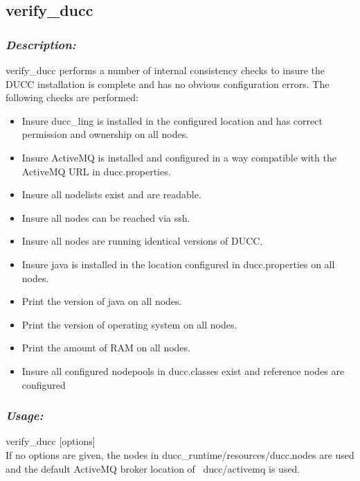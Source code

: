 \subsection{verify\_ducc}

    \subsubsection{{\em Description:}}
    verify\_ducc performs a number of internal consistency checks to insure the DUCC installation 
    is complete and has no obvious configuration errors. The following checks are performed: 
    \begin{itemize}
      \item Insure ducc\_ling is installed in the configured location and has correct permission and ownership on all nodes. 
      \item Insure ActiveMQ is installed and configured in a way compatible with the ActiveMQ URL in ducc.properties. 
      \item Insure all nodelists exist and are readable. 
      \item Insure all nodes can be reached via ssh. 
      \item Insure all nodes are running identical versions of DUCC. 
      \item Insure java is installed in the location configured in ducc.properties on all nodes. 
      \item Print the version of java on all nodes. 
      \item Print the version of operating system on all nodes. 
      \item Print the amount of RAM on all nodes. 
      \item Insure all configured nodepools in ducc.classes exist and reference nodes are configured 
      \end{itemize}
      
      \subsubsection{{\em Usage:}}

         \begin{description}
           \item{verify\_ducc {[options]}} \hfill \\
             If no options are given, the nodes in ducc\_runtime/resources/ducc.nodes are used 
             and the default ActiveMQ broker location of ~ducc/activemq is used. 
         \end{description}
           
